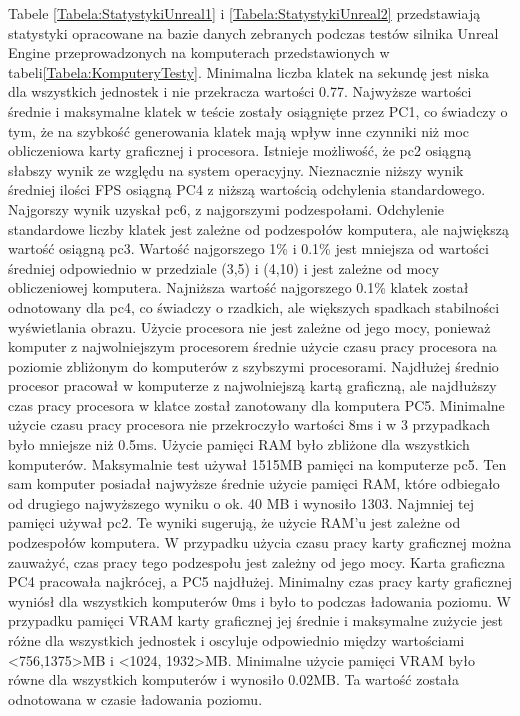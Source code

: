 \documentclass[12pt,twoside]{article}
\begin{document}
Tabele \ref{Tabela:StatystykiUnreal1} i \ref{Tabela:StatystykiUnreal2}
przedstawiają statystyki opracowane na bazie danych zebranych podczas testów
silnika Unreal Engine przeprowadzonych na komputerach przedstawionych w
tabeli\ref{Tabela:KomputeryTesty}. Minimalna liczba klatek na sekundę jest niska
dla wszystkich jednostek i nie przekracza wartości 0.77. Najwyższe wartości
średnie i maksymalne klatek w teście zostały osiągnięte przez PC1, co świadczy o
tym, że na szybkość generowania klatek mają wpływ inne czynniki niż moc
obliczeniowa karty graficznej i procesora. Istnieje możliwość, że pc2 osiągną
słabszy wynik ze względu na system operacyjny. Nieznacznie niższy wynik średniej
ilości FPS osiągną PC4 z niższą wartością odchylenia standardowego. Najgorszy
wynik uzyskał pc6, z najgorszymi podzespołami. Odchylenie standardowe liczby
klatek jest zależne od podzespołów komputera, ale największą wartość osiągną
pc3. Wartość najgorszego 1\% i 0.1\% jest mniejsza od wartości średniej
odpowiednio w przedziale (3,5) i (4,10) i jest zależne od mocy obliczeniowej
komputera. Najniższa wartość najgorszego 0.1\% klatek został odnotowany dla pc4,
co świadczy o rzadkich, ale większych spadkach stabilności wyświetlania obrazu.
Użycie procesora nie jest zależne od jego mocy, ponieważ komputer z
najwolniejszym procesorem średnie użycie czasu pracy procesora na poziomie
zbliżonym do komputerów z szybszymi procesorami. Najdłużej średnio procesor
pracował w komputerze z najwolniejszą kartą graficzną, ale najdłuższy czas pracy
procesora w klatce został zanotowany dla komputera PC5. Minimalne użycie czasu
pracy procesora nie przekroczyło wartości 8ms i w 3 przypadkach było mniejsze
niż 0.5ms. Użycie pamięci RAM było zbliżone dla wszystkich komputerów.
Maksymalnie test używał 1515MB pamięci na komputerze pc5. Ten sam komputer
posiadał najwyższe średnie użycie pamięci RAM, które odbiegało od drugiego
najwyższego wyniku o ok. 40 MB i wynosiło 1303. Najmniej tej pamięci używał pc2.
Te wyniki sugerują, że użycie RAM’u jest zależne od podzespołów komputera. W
przypadku użycia czasu pracy karty graficznej można zauważyć, czas pracy tego
podzespołu jest zależny od jego mocy. Karta graficzna PC4 pracowała najkrócej, a
PC5 najdłużej. Minimalny czas pracy karty graficznej wyniósł dla wszystkich
komputerów 0ms i było to podczas ładowania poziomu. W przypadku pamięci VRAM
karty graficznej jej średnie i maksymalne zużycie jest różne dla wszystkich
jednostek i oscyluje odpowiednio między wartościami <756,1375>MB i <1024,
1932>MB. Minimalne użycie pamięci VRAM było równe dla wszystkich komputerów i
wynosiło 0.02MB. Ta wartość została odnotowana w czasie ładowania poziomu. 
\end{document}

